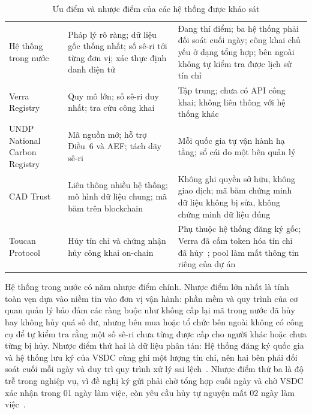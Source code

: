 \begin{table}[!htbp]
    \centering
    \caption{Ưu điểm và nhược điểm của các hệ thống được khảo sát}
    \label{tab:ks-uunhuoc}
    \small
    \begin{tabularx}{\textwidth}{|L{2.8cm}|Y|Y|}
        \hline
         &  &  \\
        \hline
        Hệ thống trong nước & Pháp lý rõ ràng; dữ liệu gốc thống nhất; số sê-ri tới từng đơn vị; xác thực định danh điện tử & Đang thí điểm; ba hệ thống phải đối soát cuối ngày; công khai chủ yếu ở dạng tổng hợp; bên ngoài không tự kiểm tra được lịch sử tín chỉ \\
        \hline
        Verra Registry & Quy mô lớn; số sê-ri duy nhất; tra cứu công khai & Tập trung; chưa có API công khai; không liên thông với hệ thống khác \\
        \hline
        UNDP National Carbon Registry & Mã nguồn mở; hỗ trợ Điều~6 và AEF; tách dãy sê-ri & Mỗi quốc gia tự vận hành hạ tầng; sổ cái do một bên quản lý \\
        \hline
        CAD Trust & Liên thông nhiều hệ thống; mô hình dữ liệu chung; mã băm trên blockchain & Không ghi quyền sở hữu, không giao dịch; mã băm chứng minh dữ liệu không bị sửa, không chứng minh dữ liệu đúng \\
        \hline
        Toucan Protocol & Hủy tín chỉ và chứng nhận hủy công khai on-chain & Phụ thuộc hệ thống đăng ký gốc; Verra đã cấm token hóa tín chỉ đã hủy~\cite{verra2022crypto}; pool làm mất thông tin riêng của dự án \\
        \hline
    \end{tabularx}
\end{table}

Hệ thống trong nước có năm nhược điểm chính. Nhược điểm lớn nhất là tính toàn vẹn dựa vào niềm tin vào đơn vị vận hành: phần mềm và quy trình của cơ quan quản lý bảo đảm các ràng buộc như không cấp lại mã trong nước đã hủy hay không hủy quá số dư, nhưng bên mua hoặc tổ chức bên ngoài không có công cụ để tự kiểm tra rằng một số sê-ri chưa từng được cấp cho người khác hoặc chưa từng bị hủy. Nhược điểm thứ hai là dữ liệu phân tán: Hệ thống đăng ký quốc gia và hệ thống lưu ký của VSDC cùng ghi một lượng tín chỉ, nên hai bên phải đối soát cuối mỗi ngày và duy trì quy trình xử lý sai lệch~\cite{vietnam2026thongtu11}. Nhược điểm thứ ba là độ trễ trong nghiệp vụ, vì đề nghị ký gửi phải chờ tổng hợp cuối ngày và chờ VSDC xác nhận trong 01 ngày làm việc, còn yêu cầu hủy tự nguyện mất 02 ngày làm việc~\cite{vietnam2026thongtu11}.

